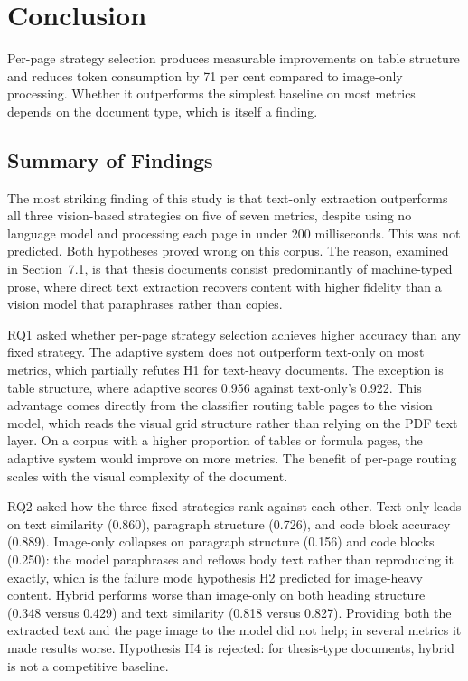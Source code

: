 \chapter{Conclusion}

Per-page strategy selection produces measurable improvements on table structure
and reduces token consumption by 71 per cent compared to image-only processing.
Whether it outperforms the simplest baseline on most metrics depends on the
document type, which is itself a finding.

\section{Summary of Findings}

The most striking finding of this study is that text-only extraction outperforms
all three vision-based strategies on five of seven metrics, despite using no
language model and processing each page in under 200 milliseconds. This was not
predicted. Both hypotheses proved wrong on this corpus. The reason, examined in
Section~7.1, is that thesis documents consist predominantly of machine-typed
prose, where direct text extraction recovers content with higher fidelity than
a vision model that paraphrases rather than copies.

RQ1 asked whether per-page strategy selection achieves higher accuracy than any
fixed strategy. The adaptive system does not outperform text-only on most metrics,
which partially refutes H1 for text-heavy documents. The exception is table
structure, where adaptive scores 0.956 against text-only's 0.922. This advantage
comes directly from the classifier routing table pages to the vision model, which
reads the visual grid structure rather than relying on the PDF text layer. On a
corpus with a higher proportion of tables or formula pages, the adaptive system
would improve on more metrics. The benefit of per-page routing scales with the
visual complexity of the document.

RQ2 asked how the three fixed strategies rank against each other. Text-only leads
on text similarity (0.860), paragraph structure (0.726), and code block accuracy
(0.889). Image-only collapses on paragraph structure (0.156) and code blocks
(0.250): the model paraphrases and reflows body text rather than reproducing it
exactly, which is the failure mode hypothesis H2 predicted for image-heavy content.
Hybrid performs worse than image-only on both heading structure (0.348 versus
0.429) and text similarity (0.818 versus 0.827). Providing both the extracted text
and the page image to the model did not help; in several metrics it made results
worse. Hypothesis H4 is rejected: for thesis-type documents, hybrid is not a
competitive baseline.

